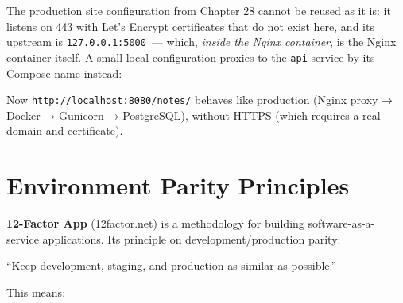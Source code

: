 \noindent{}The production site configuration from Chapter 28 cannot be reused as it is: it listens on 443 with Let's Encrypt certificates that do not exist here, and its upstream is \texttt{127.0.0.1:5000}~--- which, \emph{inside the Nginx container}, is the Nginx container itself. A small local configuration proxies to the \texttt{api} service by its Compose name instead:

\begin{codebox}[short]

\begin{Shaded}
\begin{Highlighting}[]
\NormalTok{    \}}
\NormalTok{\}}
\end{Highlighting}
\end{Shaded}

\end{codebox}

\noindent{}Now \texttt{http:}\allowbreak{}\texttt{/}\allowbreak{}\texttt{/}\allowbreak{}\texttt{localhost:}\allowbreak{}\texttt{8080/}\allowbreak{}\texttt{notes/} behaves like production (Nginx proxy → Docker → Gunicorn → PostgreSQL), without HTTPS (which requires a real domain and certificate).

\setcounter{section}{9}
\section{Environment Parity Principles}\label{39-local-vs-production:3910-environment-parity-principles}

\textbf{12-Factor App} (12factor.net) is a methodology for building software-as-a-service applications. Its principle on development/production parity:

\begin{notebox}

``Keep development, staging, and production as similar as possible.''

\end{notebox}

\noindent{}This means:

